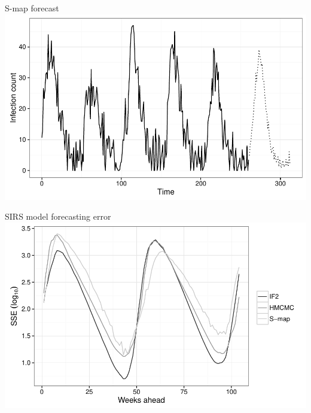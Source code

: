 \documentclass[12pt]{beamer}
\begin{document}
\begin{frame}

	\null
	\vfill
	S-map forecast \\
	\vspace{\baselineskip}
	\includegraphics[width=\textwidth,height=\textheight,keepaspectratio=true]{../../writing/SIRS-SMAP/images/smap-project}
	\vfill

\end{frame}

\begin{frame}

	\null
	\vfill
	SIRS model forecasting error \\
	\vspace{\baselineskip}
	\includegraphics[width=\textwidth,height=\textheight,keepaspectratio=true]{../../writing/SIRS-SMAP/images/sseplot}
	\vfill

\end{frame}
\end{document}
